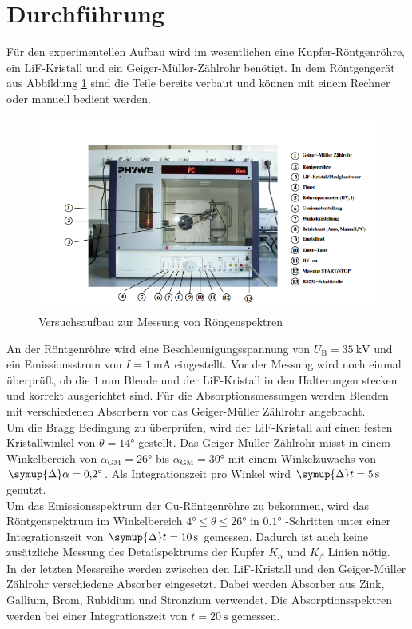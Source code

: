 \section{Durchführung}
Für den experimentellen Aufbau wird im wesentlichen eine Kupfer-Röntgenröhre, ein LiF-Kristall und ein Geiger-Müller-Zählrohr benötigt. In dem Röntgengerät aus Abbildung \ref{fig:aufbau}
sind die Teile bereits verbaut und können mit einem Rechner oder manuell bedient werden.
\begin{figure}
    \centering
    \caption{Versuchsaufbau zur Messung von Röngenspektren \cite{V602}}
    \label{fig:aufbau}
    \includegraphics[width = 0.6 \textwidth]{pics/gerät.png}
\end{figure}
An der Röntgenröhre wird eine Beschleunigungsspannung von $U_\text{B}=\SI{35}{\kilo \volt}$ und ein Emissionsstrom von $I=\SI{1}{\milli\ampere}$ eingestellt.
Vor der Messung wird noch einmal überprüft, ob die $\SI{1}{\milli\metre}$ Blende und der LiF-Kristall in den Halterungen stecken und korrekt ausgerichtet sind.
Für die Absorptionsmessungen werden Blenden mit verschiedenen Absorbern vor das Geiger-Müller Zählrohr angebracht.
\\
Um die Bragg Bedingung zu überprüfen, wird der LiF-Kristall auf einen festen Kristallwinkel von $\theta=\ang{14;;}$ gestellt. Das Geiger-Müller Zählrohr misst in einem Winkelbereich von 
$\alpha_\text{GM}=\ang{26;;} $ bis $\alpha_\text{GM}=\ang{30;;} $ mit einem Winkelzuwachs von $\symup{\Delta} \alpha =\ang{0.2;;}$. Als Integrationszeit pro Winkel wird 
$\symup{\Delta}t=\SI{5}{\second}$ genutzt.
\\
Um das Emissionsspektrum der Cu-Röntgenröhre zu bekommen, wird das Röntgenspektrum im Winkelbereich $\ang{4;;} \leq \theta \leq \ang{26;;}$ in $\ang{0.1;;}$
-Schritten unter einer Integrationszeit von $\symup{\Delta}t=\SI{10}{\second}$ gemessen. Dadurch ist auch keine zusätzliche Messung des Detailspektrums der Kupfer $K_\alpha$
und $K_\beta$ Linien nötig.
\\
In der letzten Messreihe werden zwischen den LiF-Kristall und den Geiger-Müller Zählrohr verschiedene Absorber eingesetzt. Dabei werden Absorber aus Zink, Gallium, Brom, Rubidium und Stronzium verwendet.
Die Absorptionsspektren werden bei einer Integrationszeit von $t=\SI{20}{\second}$ gemessen.